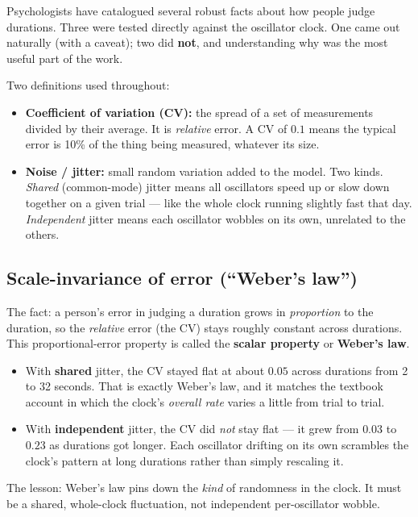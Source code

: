 \documentclass[11pt]{article}
\begin{document}
Psychologists have catalogued several robust facts about how people judge durations.
Three were tested directly against the oscillator clock. One came out naturally (with
a caveat); two did \textbf{not}, and understanding why was the most useful part of the
work.

Two definitions used throughout:

\begin{itemize}
\item \textbf{Coefficient of variation (CV):} the spread of a set of measurements
divided by their average. It is \emph{relative} error. A CV of $0.1$ means the typical
error is 10\% of the thing being measured, whatever its size.
\item \textbf{Noise / jitter:} small random variation added to the model. Two kinds.
\emph{Shared} (common-mode) jitter means all oscillators speed up or slow down
together on a given trial --- like the whole clock running slightly fast that day.
\emph{Independent} jitter means each oscillator wobbles on its own, unrelated to the
others.
\end{itemize}

\subsection{Scale-invariance of error (``Weber's law'')}

The fact: a person's error in judging a duration grows in \emph{proportion} to the
duration, so the \emph{relative} error (the CV) stays roughly constant across
durations. This proportional-error property is called the \textbf{scalar property} or
\textbf{Weber's law}.

\begin{itemize}
\item With \textbf{shared} jitter, the CV stayed flat at about $0.05$ across durations
from 2 to 32 seconds. That is exactly Weber's law, and it matches the textbook account
in which the clock's \emph{overall rate} varies a little from trial to trial.
\item With \textbf{independent} jitter, the CV did \emph{not} stay flat --- it grew
from $0.03$ to $0.23$ as durations got longer. Each oscillator drifting on its own
scrambles the clock's pattern at long durations rather than simply rescaling it.
\end{itemize}

The lesson: Weber's law pins down the \emph{kind} of randomness in the clock. It must
be a shared, whole-clock fluctuation, not independent per-oscillator wobble.
\end{document}
